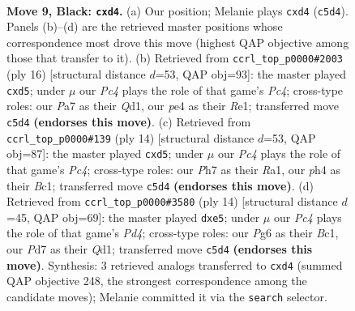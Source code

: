 \documentclass[11pt]{article}
\begin{document}
\clearpage

\begin{figure}[p]\centering
\begin{subfigure}{0.46\textwidth}\centering
\resizebox{\linewidth}{!}{%
\newchessgame
\chessboard[
  setfen={1rbqr1k1/pp1pppbp/2n2np1/2p5/2PPP2P/2N2NP1/PP3PB1/R1BQ1RK1 b - - 0 9},
  showmover=false,
  pgfstyle=straightmove, color=movearrow, markmove={c5-d4}
]}
\caption{}
\end{subfigure}\hfill
\begin{subfigure}{0.46\textwidth}\centering
\resizebox{\linewidth}{!}{%
\newchessgame
\chessboard[
  setfen={rn1qr1k1/pbp1bppp/1p2pn2/3p4/2PP4/2N2NP1/PP2PPBP/R1BQR1K1 w - - 0 9},
  showmover=false,
  pgfstyle=straightmove, color=movearrow, markmove={c4-d5}
]}
\caption{}
\end{subfigure}
\\[4pt]
\begin{subfigure}{0.46\textwidth}\centering
\resizebox{\linewidth}{!}{%
\newchessgame
\chessboard[
  setfen={rnbq1rk1/pp2ppbp/2p2np1/3p4/2PP4/2N2NP1/PP2PPBP/R1BQ1RK1 w - - 0 8},
  showmover=false,
  pgfstyle=straightmove, color=movearrow, markmove={c4-d5}
]}
\caption{}
\end{subfigure}\hfill
\begin{subfigure}{0.46\textwidth}\centering
\resizebox{\linewidth}{!}{%
\newchessgame
\chessboard[
  setfen={r1bq1rk1/pppnnpbp/3p2p1/4p3/2PP4/2N2NP1/PP2PPBP/R1BQ1RK1 w - - 8 8},
  showmover=false,
  pgfstyle=straightmove, color=movearrow, markmove={d4-e5}
]}
\caption{}
\end{subfigure}
\caption{\textbf{Move 9, Black: \texttt{cxd4}.} (a) Our position; Melanie plays \texttt{cxd4} (\texttt{c5d4}). Panels (b)--(d) are the retrieved master positions whose correspondence most drove this move (highest QAP objective among those that transfer to it). (b) Retrieved from \texttt{ccrl\_top\_p0000\#2003} (ply 16) [structural distance $d$=53, QAP obj=93]: the master played \texttt{cxd5}; under $\mu$ our \emph{Pc4} plays the role of that game's \emph{Pc4}; cross-type roles: our \emph{P}a7 as their \emph{Q}d1, our \emph{p}e4 as their \emph{R}e1; transferred move \texttt{c5d4} \textbf{(endorses this move)}. (c) Retrieved from \texttt{ccrl\_top\_p0000\#139} (ply 14) [structural distance $d$=53, QAP obj=87]: the master played \texttt{cxd5}; under $\mu$ our \emph{Pc4} plays the role of that game's \emph{Pc4}; cross-type roles: our \emph{P}h7 as their \emph{R}a1, our \emph{p}h4 as their \emph{B}c1; transferred move \texttt{c5d4} \textbf{(endorses this move)}. (d) Retrieved from \texttt{ccrl\_top\_p0000\#3580} (ply 14) [structural distance $d$=45, QAP obj=69]: the master played \texttt{dxe5}; under $\mu$ our \emph{Pc4} plays the role of that game's \emph{Pd4}; cross-type roles: our \emph{P}g6 as their \emph{B}c1, our \emph{P}d7 as their \emph{Q}d1; transferred move \texttt{c5d4} \textbf{(endorses this move)}. Synthesis: 3 retrieved analogs transferred to \texttt{cxd4} (summed QAP objective 248, the strongest correspondence among the candidate moves); Melanie committed it via the \texttt{search} selector.}
\label{fig:thought-m17}
\end{figure}
\end{document}
